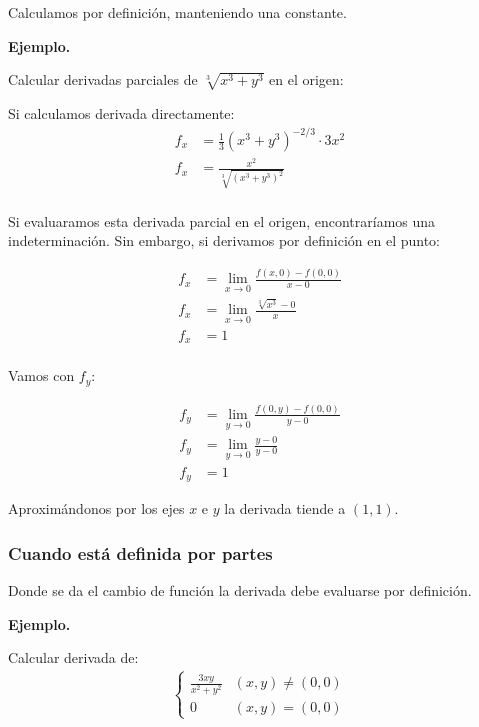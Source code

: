 Calculamos por definición,
manteniendo una constante.

\vspace{.5cm}
\textbf{Ejemplo.}

Calcular derivadas parciales de \(\sqrt[3]{x^{3} + y^{3}}\) en el origen:

Si calculamos derivada directamente:
\begin{align*}
    f_x & = \frac{1}{3}(x^{3} + y^{3})^{-2/3} \cdot 3x^{2} \\
    f_x & = \frac{x^{2}}{\sqrt[3]{(x^{3} + y^{3})^{2}}}    \\
\end{align*}

Si evaluaramos esta derivada parcial en el origen,
encontraríamos una indeterminación.
Sin embargo,
si derivamos por definición en el punto:

\begin{align*}
    f_x & = \lim_{x \to 0}\frac{f(x,0) - f(0,0)}{x - 0}  \\
    f_x & = \lim_{x \to 0} \frac{\sqrt[3]{x^{3}} - 0}{x} \\
    f_x & = \boxed{1}                                    \\
\end{align*}

Vamos con \(f_y\):

\begin{align*}
    f_y & = \lim_{y \to 0}\frac{f(0,y) - f(0,0)}{y - 0} \\
    f_y & = \lim_{y \to 0}\frac{y - 0}{y - 0}           \\
    f_y & = \boxed{1}
\end{align*}

Aproximándonos por los ejes \(x\) e \(y\) la derivada tiende a \((1,1)\).


\subsubsection{Cuando está definida por partes}

Donde se da el cambio de función la derivada debe evaluarse por definición.

\vspace{.5cm}
\textbf{Ejemplo.}

Calcular derivada de:
\begin{align*}
    \begin{cases}
        \frac{3xy}{x^{2} + y^{2}} & (x,y)\neq (0,0) \\
        0                         & (x,y) = (0,0)
    \end{cases}
\end{align*}


